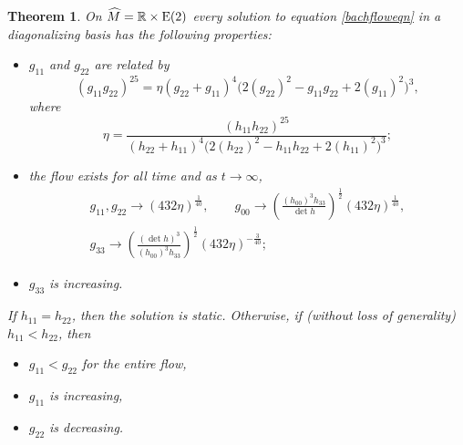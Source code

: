 \documentclass[10pt,a4paper]{amsart}
\numberwithin{equation}{section}
\newtheorem{Theorem}{Theorem}[section]
\begin{document}
\begin{Theorem} \label{e2thm}
On $\widehat{M} = \mathbb{R} \times {\rm E}(2)$ every solution to equation \eqref{bachfloweqn} in a diagonalizing basis has the following properties:
\begin{itemize}\itemsep=0pt
\item $g_{11}$ and $g_{22}$ are related by
\[
(g_{11} g_{22})^{25} = \eta (g_{22} + g_{11})^{4} \big(2(g_{22})^2 - g_{11} g_{22} + 2(g_{11})^2\big)^{3},
\]
where
\[
\eta = \frac{(h_{11} h_{22})^{25}}{(h_{22} + h_{11})^{4}
				\big(2(h_{22})^2 - h_{11} h_{22} + 2(h_{11})^2\big)^{3}};
\]
\item the flow exists for all time and as $t \rightarrow \infty$,
\begin{gather*}
g_{11}, g_{22} \rightarrow (432 \eta)^{\frac{1}{40}}, \qquad
g_{00} \rightarrow \left(\frac{(h_{00})^3 h_{33}}{\det h} \right)^{\frac{1}{2}} (432 \eta)^{\frac{1}{40}}, \\
g_{33} \rightarrow \left( \frac{(\det h)^{3}}{(h_{00})^{3} h_{33}} \right)^{\frac{1}{2}} (432 \eta)^{-\frac{3}{40}};
\end{gather*}
\item $g_{33}$ is increasing.
\end{itemize}
If $h_{11} = h_{22}$, then the solution is static. Otherwise, if (without loss of generality) $h_{11} < h_{22}$, then
\begin{itemize}\itemsep=0pt
\item $g_{11} < g_{22}$ for the entire flow,
\item $g_{11}$ is increasing,
\item $g_{22}$ is decreasing.
\end{itemize}
\end{Theorem}
\end{document}
